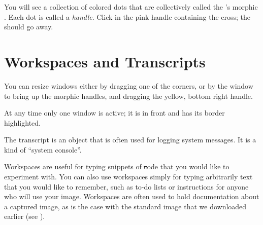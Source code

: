 \documentclass[a4paper,10pt,twoside]{book}
\begin{document}
You will see a collection of colored dots that are collectively called the \bam's morphic .
Each dot is called a \emph{handle}.
Click in the pink handle containing the cross; the \bam should go away. 


\section{Workspaces and Transcripts}
\label{sec:transcript}


You can resize windows either by dragging one of the corners, or by  the window to bring up the morphic handles, and dragging the yellow, bottom right handle.

At any time only one window is active; it is in front and has its border highlighted.

The transcript is an object that is often used for logging system messages.
It is a kind of ``system console''.

Workspaces are useful for typing snippets of \st code that you would like to experiment with.
You can also use workspaces simply for typing arbitrarily text that you would like to remember, such as to-do lists or instructions for anyone who will use your image.
Workspaces are often used to hold documentation about a captured image, as is the case with the standard image that we downloaded earlier (see ).
\end{document}
